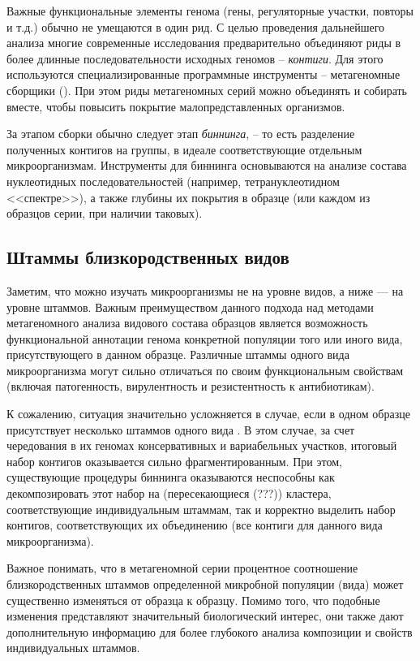 \documentclass{spbau-diploma}
\begin{document}
Важные функциональные элементы генома (гены, регуляторные участки, повторы и т.д.) обычно не умещаются в один рид. 
С целью проведения дальнейшего анализа многие современные исследования предварительно объединяют риды в более длинные последовательности исходных геномов -- \textit{контиги}. Для этого используются специализированные программные инструменты -- метагеномные сборщики (\cite{IDBA-UD, MEGAHIT, MetaVelvet, RayMeta, MetaSpades}). При этом риды метагеномных серий можно объединять и собирать вместе, чтобы повысить покрытие малопредставленных организмов. 

За этапом сборки обычно следует этап \textit{биннинга}, -- то есть разделение полученных контигов на группы, в идеале соответствующие отдельным микроорганизмам. Инструменты для биннинга \cite{CONCOCT, GroopM, MyCC, MetaBAT} основываются на анализе состава нуклеотидных последовательностей (например, тетрануклеотидном <<спектре>>), а также глубины их покрытия в образце (или каждом из образцов серии, при наличии таковых). 


\subsection{Штаммы близкородственных видов}


Заметим, что можно изучать микроорганизмы не на уровне видов, а ниже --- на уровне штаммов. Важным преимуществом данного подхода над методами метагеномного анализа видового состава образцов является возможность функциональной аннотации генома конкретной популяции того или иного вида, присутствующего в данном образце. Различные штаммы одного вида микроорганизма могут сильно отличаться по своим функциональным свойствам (включая патогенность, вирулентность и резистентность к антибиотикам).

К сожалению, ситуация значительно усложняется  в случае, если в одном образце присутствует несколько штаммов одного вида \cite{StrainEst, metasub, infant_gut}.
В этом случае, за счет чередования в их геномах консервативных и вариабельных участков, итоговый набор контигов оказывается сильно фрагментированным. При этом, существующие процедуры биннинга оказываются неспособны как декомпозировать этот набор на (пересекающиеся (???)) кластера, соответствующие индивидуальным штаммам, так и корректно выделить набор контигов, соответствующих их объединению (все контиги для данного вида микроорганизма).

Важное понимать, что в метагеномной серии процентное соотношение близкородственных штаммов определенной микробной популяции (вида) может существенно изменяться от образца к образцу. Помимо того, что подобные изменения представляют значительный биологический интерес, они также дают дополнительную информацию для более глубокого анализа композиции и свойств индивидуальных штаммов.
\end{document}
